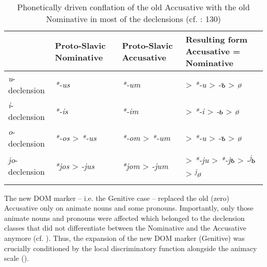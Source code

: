 \documentclass[output=paper]{langsci/langscibook}
\begin{document}
\begin{table}
\begin{tabularx}{\textwidth}{lp{2.3cm}p{2.3cm}Q}
\lsptoprule
\bfseries ~ & \bfseries Proto-Slavic Nominative & \bfseries Proto-Slavic Accusative & {\bfseries Resulting form}
\bfseries Accusative = Nominative\\
\midrule
\textit{u}{}-declension & \textit{*-us} & \textit{*-um} & > \textit{*-u} > \textit{-{ъ}} > \textit{ø}\\
\textit{i}{}-declension & \textit{*-is} & \textit{*-im} & > \textit{*-i} > \textit{-{ь}} > \textit{ø}\\
\textit{o}{}-declension & \textit{*-os} > \textit{*-us} & \textit{*-om} > \textit{*-um} & > \textit{*-u} > \textit{-{ъ}} > \textit{ø}\\
\textit{jo}{}-declension & \textit{*jos} > \textit{-jus} & \textit{*jom} > \textit{-jum} & > \textit{*-ju} > \textit{*}\textit{{}-j}\textit{{ъ} }> \textit{-\textsuperscript{j}}\textit{{ь}} > \textit{\textsuperscript{j}}\textit{ø}\\
\lspbottomrule
\end{tabularx}

\caption{Phonetically driven conflation of the old Accusative with the old Nominative in most of the declensions (cf. \citealt{Arumaa1985}: 130)}
\label{tab:serzant:1}
\end{table}

The new DOM marker – i.e. the Genitive case – replaced the old (zero) Accusative only on animate nouns and some pronouns. Importantly, only those animate nouns and pronouns were affected which belonged to the declension classes that did not differentiate between the Nominative and the Accusative anymore (cf. ). Thus, the expansion of the new DOM marker (Genitive) was crucially conditioned by the local discriminatory function alongside the animacy scale (\citealt{Krysko1994_Russ}). 
\end{document}
